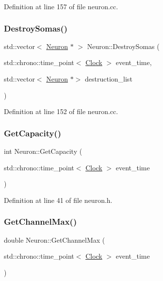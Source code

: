 Definition at line 157 of file neuron.\+cc.

\mbox{\label{class_neuron_a32b3a98eec58dc66481a2b877a7592cb}} 
\subsubsection{\texorpdfstring{Destroy\+Somas()}{DestroySomas()}}
{\footnotesize\ttfamily std\+::vector$<$ \mbox{\hyperlink{class_neuron}{Neuron}} $\ast$ $>$ Neuron\+::\+Destroy\+Somas (\begin{DoxyParamCaption}\item[{std\+::chrono\+::time\+\_\+point$<$ \mbox{\hyperlink{universe_8h_a0ef8d951d1ca5ab3cfaf7ab4c7a6fd80}{Clock}} $>$}]{event\+\_\+time,  }\item[{std\+::vector$<$ \mbox{\hyperlink{class_neuron}{Neuron}} $\ast$$>$}]{destruction\+\_\+list }\end{DoxyParamCaption})}



Definition at line 152 of file neuron.\+cc.

\mbox{\label{class_neuron_a93cce70c19c8e70accaa31908d3f29f6}} 
\subsubsection{\texorpdfstring{Get\+Capacity()}{GetCapacity()}}
{\footnotesize\ttfamily int Neuron\+::\+Get\+Capacity (\begin{DoxyParamCaption}\item[{std\+::chrono\+::time\+\_\+point$<$ \mbox{\hyperlink{universe_8h_a0ef8d951d1ca5ab3cfaf7ab4c7a6fd80}{Clock}} $>$}]{event\+\_\+time }\end{DoxyParamCaption})\hspace{0.3cm}{\ttfamily [inline]}}



Definition at line 41 of file neuron.\+h.

\mbox{\label{class_neuron_ae8b6c47bebe302e62721dc4a6e447ca2}} 
\subsubsection{\texorpdfstring{Get\+Channel\+Max()}{GetChannelMax()}}
{\footnotesize\ttfamily double Neuron\+::\+Get\+Channel\+Max (\begin{DoxyParamCaption}\item[{std\+::chrono\+::time\+\_\+point$<$ \mbox{\hyperlink{universe_8h_a0ef8d951d1ca5ab3cfaf7ab4c7a6fd80}{Clock}} $>$}]{event\+\_\+time }\end{DoxyParamCaption})\hspace{0.3cm}{\ttfamily [inline]}}



